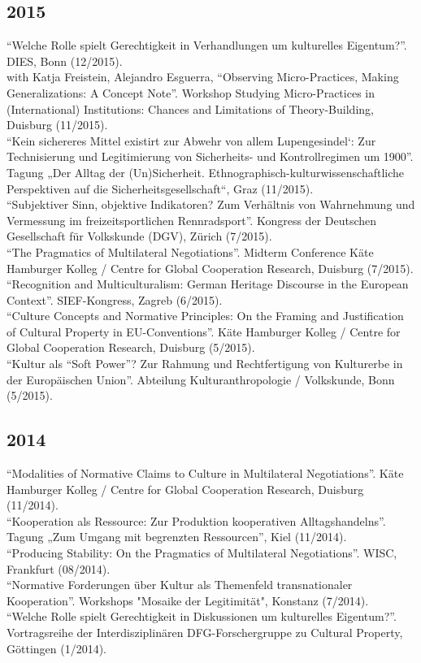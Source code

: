 \documentclass[11pt, a4paper]{article} %
\begin{document}
\subsection*{2015}
\enquote{Welche Rolle spielt Gerechtigkeit in Verhandlungen um kulturelles Eigentum?}. DIES, Bonn (12/2015).\\[.25cm]
with Katja Freistein, Alejandro Esguerra, \enquote{Observing Micro-Practices, Making Generalizations: A Concept Note}. Workshop Studying Micro-Practices in (International) Institutions: Chances and Limitations of Theory-Building, Duisburg (11/2015).\\[.25cm]
\enquote{Kein sichereres Mittel existirt zur Abwehr von allem Lupengesindel‘: Zur Technisierung und Legitimierung von Sicherheits- und Kontrollregimen um 1900}. Tagung „Der Alltag der (Un)Sicherheit. Ethnographisch-kulturwissenschaftliche Perspektiven auf die Sicherheitsgesellschaft“, Graz (11/2015).\\[.25cm]
\enquote{Subjektiver Sinn, objektive Indikatoren? Zum Verhältnis von Wahrnehmung und Vermessung im freizeitsportlichen Rennradsport}. Kongress der Deutschen Gesellschaft für Volkskunde (DGV), Zürich (7/2015).\\[.25cm]
\enquote{The Pragmatics of Multilateral Negotiations}. Midterm Conference Käte Hamburger Kolleg / Centre for Global Cooperation Research, Duisburg (7/2015).\\[.25cm]
\enquote{Recognition and Multiculturalism: German Heritage Discourse in the European Context}. SIEF-Kongress, Zagreb (6/2015).\\[.25cm]
\enquote{Culture Concepts and Normative Principles: On the Framing and Justification of Cultural Property in EU-Conventions}. Käte Hamburger Kolleg / Centre for Global Cooperation Research, Duisburg (5/2015).\\[.25cm]
\enquote{Kultur als “Soft Power”? Zur Rahmung und Rechtfertigung von Kulturerbe in der Europäischen Union}. Abteilung Kulturanthropologie / Volkskunde, Bonn (5/2015).
\subsection*{2014}
\enquote{Modalities of Normative Claims to Culture in Multilateral Negotiations}. Käte Hamburger Kolleg / Centre for Global Cooperation Research, Duisburg (11/2014).\\[.25cm]
\enquote{Kooperation als Ressource: Zur Produktion kooperativen Alltagshandelns}. Tagung „Zum Umgang mit begrenzten Ressourcen”, Kiel (11/2014).\\[.25cm]
\enquote{Producing Stability: On the Pragmatics of Multilateral Negotiations}. WISC, Frankfurt (08/2014).\\[.25cm]
\enquote{Normative Forderungen über Kultur als Themenfeld transnationaler Kooperation}. Workshops "Mosaike der Legitimität", Konstanz (7/2014).\\[.25cm]
\enquote{Welche Rolle spielt Gerechtigkeit in Diskussionen um kulturelles Eigentum?}. Vortragsreihe der Interdisziplinären DFG-Forschergruppe zu Cultural Property, Göttingen (1/2014).
\end{document}
